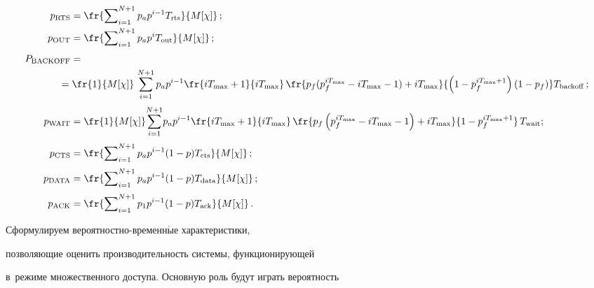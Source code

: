 \begin{align*}


p_{\mathrm{RTS}} &= \fr{\sum\nolimits_{i=1}^{N+1} p_a p^{i-1}T_{\mathrm{rts}}}{M[\chi]}\,;\\


p_{\mathrm{OUT}} &= \fr{\sum\nolimits_{i=1}^{N+1} p_a p^i T_{\mathrm{out}}}{M[\chi]}\,;\\[3pt]


P_{\mathrm{BACKOFF}} &={}\\


&\hspace*{-12pt}{}= \fr{1}{{M[\chi]}}\,


\sum\limits_{i=1}^{N+1} p_a p^{i-1} 


\fr{iT_{\max}+1}{iT_{\max}}\,\fr{p_f(p_f^{iT_{\max}}-iT_{\max}-1)+iT_{\max}}{\left(1-


p_f^{iT_{\max}+1}\right)(1-p_f)} T_{\mathrm{backoff}}\,;\\[3pt]


p_{\mathrm{WAIT}} &= \fr{1}{{M[\chi]}}\!


\sum\limits_{i=1}^{N+1} \!p_a p^{i-1} 


\fr{iT_{\max}+1}{iT_{\max}}\,\fr{p_f\left(p_f^{iT_{\max}}-iT_{\max}-1\right)+iT_{\max}}{1-


p_f^{iT_{\max}+1}}\, T_{\mathrm{wait}};\\[3pt]


p_{\mathrm{CTS}} &= \fr{\sum\nolimits_{i=1}^{N+1}  p_a p^{i-1} (1-p) 


T_{\mathrm{cts}}}{M[\chi]}\,;\\[3pt]


p_{\mathrm{DATA}} &= \fr{\sum\nolimits_{i=1}^{N+1}  p_a p^{i-1} (1-p) 


T_{\mathrm{data}}}{M[\chi]}\,;\\[3pt]


p_{\mathrm{ACK}} &= \fr{\sum\nolimits_{i=1}^{N+1} p_1 p^{i-1} (1-p)T_{\mathrm{ack}} 


}{M[\chi]}\,.


\end{align*}








Сформулируем вероятностно-вре\-мен\-н$\acute{\mbox{ы}}$е характеристики, 


позволяющие оценить производительность системы, функционирующей 


в~режиме множественного доступа. Основную роль будут играть вероятность 


